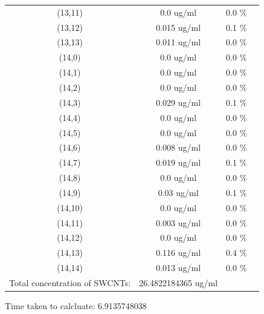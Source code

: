 \documentclass{article}
\begin{document}
\begin{tabular}{c c c c}
(13,11)&        0.0 ug/ml        &0.0 \%\\
(13,12)&        0.015 ug/ml        &0.1 \%\\
(13,13)&        0.011 ug/ml        &0.0 \%\\
(14,0)&        0.0 ug/ml        &0.0 \%\\
(14,1)&        0.0 ug/ml        &0.0 \%\\
(14,2)&        0.0 ug/ml        &0.0 \%\\
(14,3)&        0.029 ug/ml        &0.1 \%\\
(14,4)&        0.0 ug/ml        &0.0 \%\\
(14,5)&        0.0 ug/ml        &0.0 \%\\
(14,6)&        0.008 ug/ml        &0.0 \%\\
(14,7)&        0.019 ug/ml        &0.1 \%\\
(14,8)&        0.0 ug/ml        &0.0 \%\\
(14,9)&        0.03 ug/ml        &0.1 \%\\
(14,10)&        0.0 ug/ml        &0.0 \%\\
(14,11)&        0.003 ug/ml        &0.0 \%\\
(14,12)&        0.0 ug/ml        &0.0 \%\\
(14,13)&        0.116 ug/ml        &0.4 \%\\
(14,14)&        0.013 ug/ml        &0.0 \%\\
Total concentration of SWCNTs: &26.4822184365 ug/ml\\

\end{tabular}Time taken to calcluate: 6.9135748038
\end{document}
